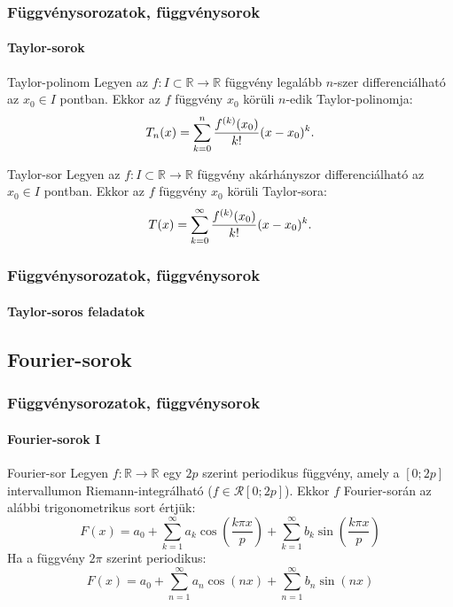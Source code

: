 \begin{frame}
  \frametitle{Függvénysorozatok, függvénysorok}
  \framesubtitle{Taylor-sorok}

  \begin{block}{Taylor-polinom}
    Legyen az $f : I \subset \mathbb R \rightarrow \mathbb R$ függvény legalább
    $n$-szer differenciálható az $x_0 \in I$ pontban. Ekkor az $f$ függvény
    $x_0$ körüli $n$-edik Taylor-polinomja:
    \[
      T_n(x)
      = \sum_{k = 0}^n
      \frac{f^{(k)}(x_0)}{k!}
      (x - x_0)^k
      \text.
    \]
  \end{block}

  \begin{block}{Taylor-sor}
    Legyen az $f : I \subset \mathbb R \rightarrow \mathbb R$ függvény
    akárhányszor differenciálható az $x_0 \in I$ pontban. Ekkor az $f$ függvény
    $x_0$ körüli Taylor-sora:
    \[
      T(x)
      = \sum_{k = 0}^\infty
      \frac{f^{(k)}(x_0)}{k!}
      (x - x_0)^k
      \text.
    \]
  \end{block}
\end{frame}

\begin{frame}
  \frametitle{Függvénysorozatok, függvénysorok}
  \framesubtitle{Taylor-soros feladatok}

  
  
\end{frame}

\subsection{Fourier-sorok}

\begin{frame}
  \frametitle{Függvénysorozatok, függvénysorok}
  \framesubtitle{Fourier-sorok I}

  \begin{block}{Fourier-sor}
    Legyen $f : \mathbb R \rightarrow \mathbb R$ egy $2p$ szerint periodikus
    függvény, amely a $[0;2p]$ intervallumon Riemann-integrálható ($f \in
      \mathcal R [0; 2p]$). Ekkor $f$ Fourier-során az alábbi trigonometrikus
    sort értjük:
    \[
      F(x)
      = a_0
      + \sum_{k = 1}^\infty a_k \cos \left( \frac{k \pi x}{p} \right)
      + \sum_{k = 1}^\infty b_k \sin \left( \frac{k \pi x}{p} \right)
    \]
    Ha a függvény $2 \pi$ szerint periodikus:
    \[
      F(x)
      = a_0
      + \sum_{n = 1}^\infty a_n \cos (nx)
      + \sum_{n = 1}^\infty b_n \sin (nx)
    \]
  \end{block}
\end{frame}

